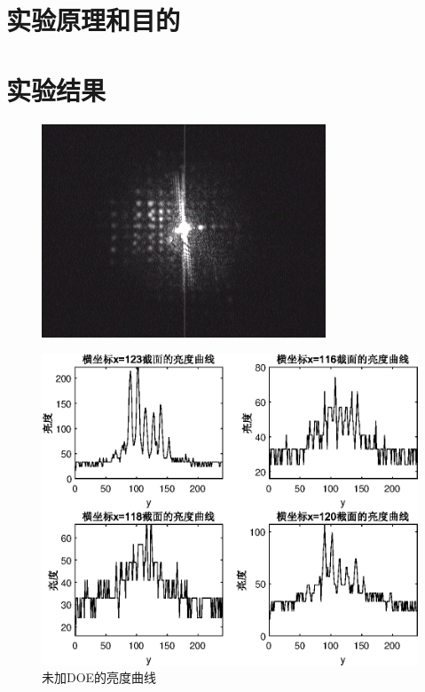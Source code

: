 \documentclass[UTF8]{ctexart}
\begin{document}
	\section{实验原理和目的}
	
	
	
	\section{实验结果}

	\begin{figure}
		\includegraphics{1.jpg}
	\end{figure}
	
	\begin{figure}[h]
		\centering
		\includegraphics{beforeDOE.eps}
		\caption{未加DOE的亮度曲线}\label{未加DOE亮度}
	\end{figure}
	
\end{document}
